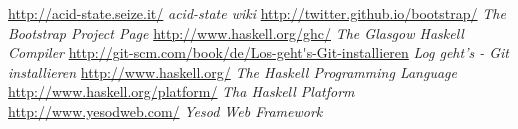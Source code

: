 \begin{thebibliography}{}
    \url{http://acid-state.seize.it/}
    \emph{acid-state wiki}
    \url{http://twitter.github.io/bootstrap/}
    \emph{The Bootstrap Project Page}
    \url{http://www.haskell.org/ghc/}
    \emph{The Glasgow Haskell Compiler}
    \url{http://git-scm.com/book/de/Los-geht's-Git-installieren}
    \emph{Log geht's - Git installieren}
    \url{http://www.haskell.org/}
    \emph{The Haskell Programming Language}
    \url{http://www.haskell.org/platform/}
    \emph{Tha Haskell Platform}
    \url{http://www.yesodweb.com/}
    \emph{Yesod Web Framework}
\end{thebibliography}